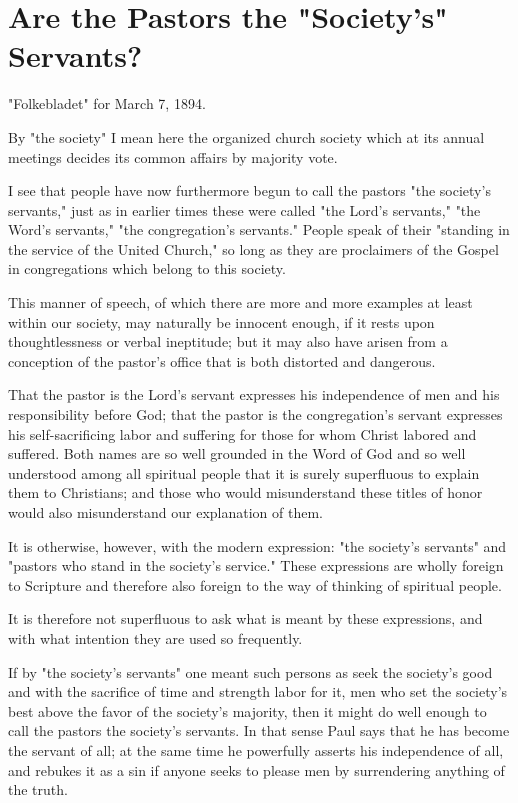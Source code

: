 
\section{Are the Pastors the "Society’s" Servants?}

"Folkebladet" for March 7, 1894.


By "the society" I mean here the organized church society which at its annual meetings decides its common affairs by majority vote.

I see that people have now furthermore begun to call the pastors "the society’s servants," just as in earlier times these were called "the Lord’s servants," "the Word’s servants," "the congregation’s servants." People speak of their "standing in the service of the United Church," so long as they are proclaimers of the Gospel in congregations which belong to this society.

This manner of speech, of which there are more and more examples at least within our society, may naturally be innocent enough, if it rests upon thoughtlessness or verbal ineptitude; but it may also have arisen from a conception of the pastor’s office that is both distorted and dangerous.

That the pastor is the Lord’s servant expresses his independence of men and his responsibility before God; that the pastor is the congregation’s servant expresses his self-sacrificing labor and suffering for those for whom Christ labored and suffered. Both names are so well grounded in the Word of God and so well understood among all spiritual people that it is surely superfluous to explain them to Christians; and those who would misunderstand these titles of honor would also misunderstand our explanation of them.

It is otherwise, however, with the modern expression: "the society’s servants" and "pastors who stand in the society’s service." These expressions are wholly foreign to Scripture and therefore also foreign to the way of thinking of spiritual people.

It is therefore not superfluous to ask what is meant by these expressions, and with what intention they are used so frequently.

If by "the society’s servants" one meant such persons as seek the society’s good and with the sacrifice of time and strength labor for it, men who set the society’s best above the favor of the society’s majority, then it might do well enough to call the pastors the society’s servants. In that sense Paul says that he has become the servant of all; at the same time he powerfully asserts his independence of all, and rebukes it as a sin if anyone seeks to please men by surrendering anything of the truth.

